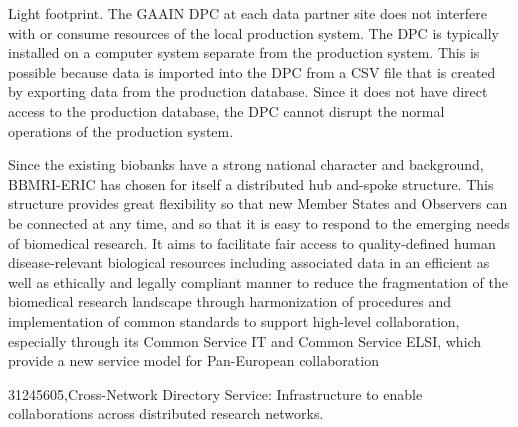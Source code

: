 Light footprint. The GAAIN DPC at each data partner site does not interfere with or
consume resources of the local production system.  The DPC is typically installed on a
computer system separate from the production system. This is possible because data is
imported into the DPC from a CSV file that is created by exporting data from the
production database. Since it does not have direct access to the production database,
the DPC cannot disrupt the normal operations of the production system.




\cite{cafevariome}
\cite{datasphere}
\cite{ehr4cr}
\cite{popmed}
\cite{gaain}

\cite{bbmieric} Since the existing biobanks have a strong national character and background, BBMRI-ERIC has chosen for itself a distributed hub and-spoke structure. This structure provides great flexibility so that new Member States and Observers can be connected at any time, and so that it is easy to respond to the emerging needs of biomedical research. It aims to facilitate fair access to quality-defined human disease-relevant biological resources including associated data in an efficient as well as ethically and legally compliant manner to reduce the fragmentation of the biomedical research landscape through harmonization of procedures and implementation of common standards to support high-level collaboration, especially through its Common Service IT and Common Service ELSI, which provide a new service model for Pan-European collaboration

31245605,Cross-Network Directory Service: Infrastructure to enable collaborations across distributed research networks.
